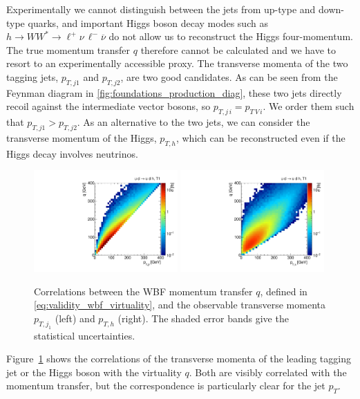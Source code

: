 Experimentally we cannot distinguish between the jets from up-type and
down-type quarks, and important Higgs boson decay modes such as
$h \to WW^* \to \ell^+ \nu \, \ell^- \overbar{\nu}$ do not allow us to
reconstruct the Higgs four-momentum. The true momentum transfer $q$
therefore cannot be calculated and we have to resort to an
experimentally accessible proxy. The transverse momenta of the two
tagging jets, $p_{T,j1}$ and $p_{T,j2}$, are two good candidates. As
can be seen from the Feynman diagram in
\autoref{fig:foundations_production_diag}, these two jets directly
recoil against the intermediate vector bosons, so
$p_{T,j\,i} = p_{T \, V \,i}$. We order them such that
$p_{T,j1} > p_{T,j2}$. As an alternative to the two jets, we can
consider the transverse momentum of the Higgs, $p_{T,h}$, which can be
reconstructed even if the Higgs decay involves neutrinos.

\begin{figure}[bt]
  \includegraphics[width=0.49\textwidth,clip=true,trim=0 0.2cm 0 0.2cm]{fig/validity/WBF_correl_q_j1pt.pdf}%
  \includegraphics[width=0.49\textwidth,clip=true,trim=0 0.2cm 0 0.2cm]{fig/validity/WBF_correl_q_Hpt.pdf}%
  \caption{Correlations between the WBF momentum transfer $q$, defined
    in \autoref{eq:validity_wbf_virtuality}, and the observable
    transverse momenta $p_{T,j_1}$ (left) and $p_{T,h}$ (right). The
    shaded error bands give the statistical uncertainties.}
  \label{fig:validity_virtuality_correlations}
\end{figure}

Figure~\ref{fig:validity_virtuality_correlations} shows the
correlations of the transverse momenta of the leading tagging jet or
the Higgs boson with the virtuality $q$. Both are visibly correlated
with the momentum transfer, but the correspondence is particularly
clear for the jet $p_T$.

